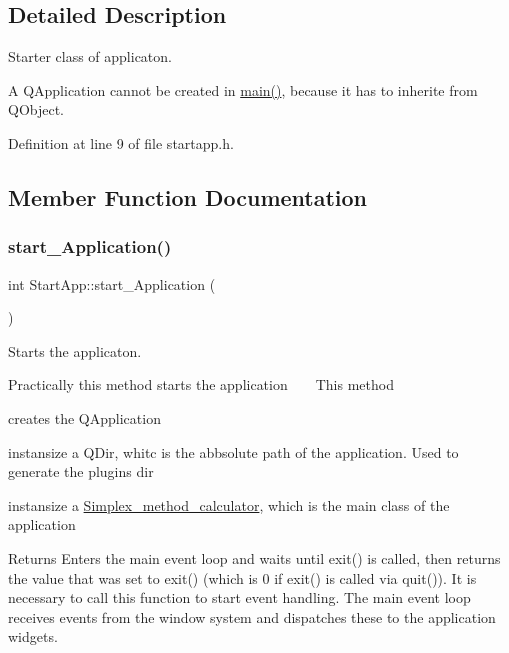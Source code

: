 \subsection{Detailed Description}
Starter class of applicaton. 

A Q\+Application cannot be created in \hyperlink{main_8cpp_ae66f6b31b5ad750f1fe042a706a4e3d4}{main()}, because it has to inherite from Q\+Object. 

Definition at line 9 of file startapp.\+h.



\subsection{Member Function Documentation}
\mbox{\label{classStartApp_ac70f07e04b8f7766858ce67d75c3b636}} 
\subsubsection{\texorpdfstring{start\+\_\+\+Application()}{start\_Application()}}
{\footnotesize\ttfamily int Start\+App\+::start\+\_\+\+Application (\begin{DoxyParamCaption}{ }\end{DoxyParamCaption})}



Starts the applicaton. 

Practically this method starts the application ~\newline
~\newline
 This method
\begin{DoxyItemize}
\item creates the Q\+Application
\item instansize a Q\+Dir, whitc is the abbsolute path of the application. Used to generate the plugins dir
\item instansize a \hyperlink{classSimplex__method__calculator}{Simplex\+\_\+method\+\_\+calculator}, which is the main class of the application
\end{DoxyItemize}

\begin{DoxyReturn}{Returns}
Enters the main event loop and waits until exit() is called, then returns the value that was set to exit() (which is 0 if exit() is called via quit()). It is necessary to call this function to start event handling. The main event loop receives events from the window system and dispatches these to the application widgets. 
\end{DoxyReturn}


